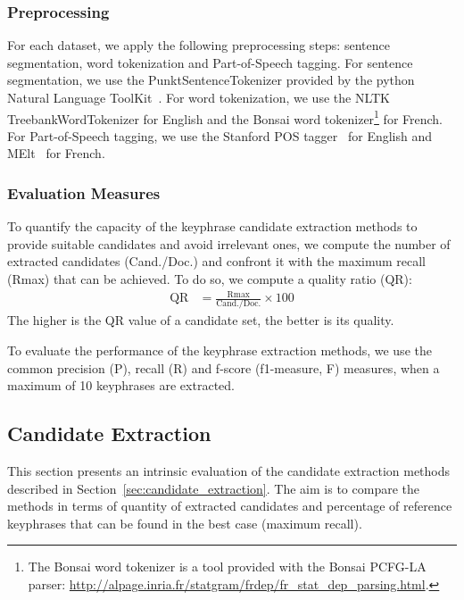     \subsubsection{Preprocessing}
    \label{subsubsec:preprocessing}
      For each dataset, we apply the following preprocessing steps: sentence
      segmentation, word tokenization and Part-of-Speech tagging. For sentence
      segmentation, we use the PunktSentenceTokenizer provided by the python
      Natural Language ToolKit~\cite{bird2009nltk}. For word tokenization, we
      use the NLTK TreebankWordTokenizer for English and the Bonsai word
      tokenizer\footnote{The Bonsai word tokenizer is a tool provided with the
      Bonsai PCFG-LA parser:
      \url{http://alpage.inria.fr/statgram/frdep/fr_stat_dep_parsing.html}.} for
      French. For Part-of-Speech tagging, we use the Stanford
      POS tagger~\cite{toutanova2003stanfordpostagger} for English and
      MElt~\cite{denis2009melt} for French.

    \subsubsection{Evaluation Measures}
    \label{subsubsec:keyphrase_extraction_evaluation_measures}
      To quantify the capacity of the keyphrase candidate extraction methods to
      provide suitable candidates and avoid irrelevant ones, we compute the
      number of extracted candidates (Cand./Doc.) and confront it with the
      maximum recall (Rmax) that can be achieved. To do so, we compute a quality
      ratio (QR):
      \begin{align}
        \text{QR} &= \frac{\text{Rmax}}{\text{Cand./Doc.}} \times 100
      \end{align}
      The higher is the QR value of a candidate set, the better is its quality.

      To evaluate the performance of the keyphrase extraction methods, we use
      the common precision (P), recall (R) and f-score (f1-measure, F) measures,
      when a maximum of 10 keyphrases are extracted.

  \subsection{Candidate Extraction}
  \label{subsec:candidate_extraction}

    This section presents an intrinsic evaluation of the candidate extraction
    methods described in Section~\ref{sec:candidate_extraction}. The aim is to
    compare the methods in terms of quantity of extracted candidates and
    percentage of reference keyphrases that can be found in the best case
    (maximum recall).

